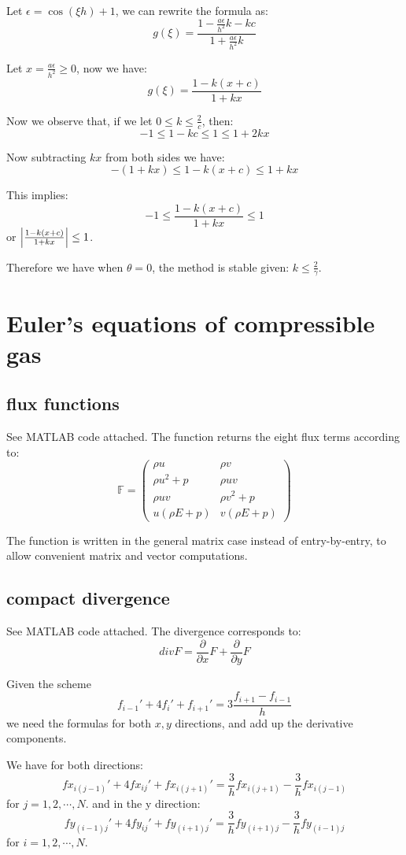 \documentclass[12pt]{article}
\newcommand{\ga}{\gamma}
\begin{document}
Let $\epsilon = \cos{(\xi h)} + 1$, we can rewrite the formula as:
$$
	g(\xi) 
	= \frac{1-\frac{a\epsilon}{h^2}k - kc}{1 + \frac{a\epsilon}{h^2}k}
$$

Let $x = \frac{a\epsilon}{h^2} \ge 0$, now we have:
$$
	g(\xi) = \frac{1-k(x+c)}{1+kx}
$$

Now we observe that, if we let $0 \le  k \le \frac{2}{c}$, then:
$$
	-1 \le 1 - kc \le 1 \le 1 + 2kx
$$

Now subtracting $kx$ from both sides we have:
$$
	-(1 + kx) \le 1 - k(x+c) \le 1 + kx
$$

This implies:
$$
	-1 \le \frac{1 - k(x+c)}{1 + kx} \le 1
$$ or $\abs{\frac{1 - k(x+c)}{1 + kx}} \le 1$.

Therefore we have when $\theta = 0$, the method is stable given: $k \le \frac{2}{\ga}$.
\section{Euler's equations of compressible gas}
\subsection{flux functions}
See MATLAB code attached. The function returns the eight flux terms according to:
$$
	\mathbb{F}
	=
	\begin{pmatrix}
		\rho u & \rho v \\
		\rho u^2 + p & \rho u v \\
		\rho u v & \rho v^2 + p \\
		u(\rho E + p) & v(\rho E + p)
	\end{pmatrix}
$$

The function is written in the general matrix case instead of entry-by-entry, to allow convenient matrix and vector computations.

\subsection{compact divergence}
See MATLAB code attached. The divergence corresponds to:
$$
	divF = \frac{\partial}{\partial x} F + \frac{\partial}{\partial y} F
$$

Given the scheme
$$
	f_{i-1}' + 4f_i' + f_{i+1}' = 3 \frac{f_{i+1} - f_{i-1}}{h}
$$ we need the formulas for both $x,y$ directions, and add up the derivative components.

We have for both directions:
$$
	fx_{i(j-1)}' + 4fx_{ij}' + fx_{i(j+1)}' = \frac{3}{h}fx_{i(j+1)}-\frac{3}{h}fx_{i(j-1)}
$$ for $j = 1,2,\cdots,N$. and in the y direction:
$$
	fy_{(i-1)j}' + 4fy_{ij}' + fy_{(i+1)j}' = \frac{3}{h}fy_{(i+1)j}-\frac{3}{h}fy_{(i-1)j}
$$ for $i = 1,2,\cdots,N$.
\end{document}
